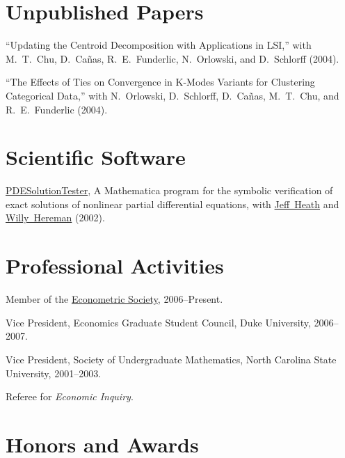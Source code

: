 \documentclass[11pt,letterpaper]{article}
\renewenvironment{itemize}{
  \begin{list}{}
    { \setlength{\itemsep}{5pt}
      \setlength{\parsep}{0pt}
      \setlength{\topsep}{0pt}
      \setlength{\leftmargin}{0em} } }{
  \end{list}}
\begin{document}
\section*{Unpublished Papers}

``Updating the Centroid Decomposition with Applications in LSI,''
with M.\ T.\ Chu, D.\ Ca\~{n}as, R.\ E.\ Funderlic, N.\ Orlowski, and
D.\ Schlorff (2004).

``The Effects of Ties on Convergence in K-Modes Variants for
Clustering Categorical Data,'' with N.\ Orlowski, D.\ Schlorff, D.\
Ca\~{n}as, M.\ T.\ Chu, and R.\ E.\ Funderlic (2004).


\section*{Scientific Software}

\href{http://jblevins.org/research/pdest}{PDESolutionTester}, A
Mathematica program for the symbolic verification of exact solutions of
nonlinear partial differential equations, with
\href{http://web.centre.edu/jeffrey.heath/}{Jeff\ Heath} and
\href{http://www.mines.edu/fs_home/whereman/}{Willy\ Hereman} (2002).


\section*{Professional Activities}

\begin{itemize}
\item Member of the
  \href{http://www.econometricsociety.org/}{Econometric Society},
  2006--Present.
\item Vice President, Economics Graduate Student Council, Duke University,
  2006--2007.
\item Vice President, Society of Undergraduate Mathematics, North
  Carolina State University, 2001--2003.
\item Referee for {\it Economic Inquiry}.
\end{itemize}


\section*{Honors and Awards}
\end{document}
